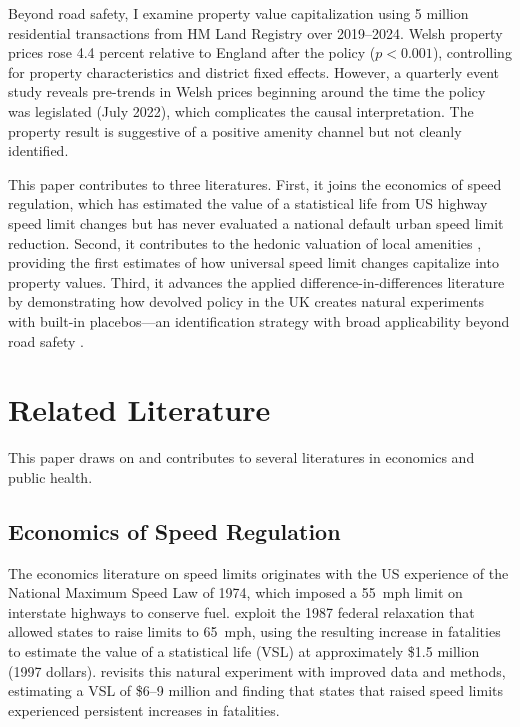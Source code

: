 \documentclass[12pt]{article}
\begin{document}
Beyond road safety, I examine property value capitalization using 5 million residential transactions from HM Land Registry over 2019--2024. Welsh property prices rose 4.4 percent relative to England after the policy ($p < 0.001$), controlling for property characteristics and district fixed effects. However, a quarterly event study reveals pre-trends in Welsh prices beginning around the time the policy was legislated (July 2022), which complicates the causal interpretation. The property result is suggestive of a positive amenity channel but not cleanly identified.

This paper contributes to three literatures. First, it joins the economics of speed regulation, which has estimated the value of a statistical life from US highway speed limit changes \citep{ashenfelter2004, vanbenthem2015} but has never evaluated a national default urban speed limit reduction. Second, it contributes to the hedonic valuation of local amenities \citep{rosen1974, chay2005, black1999}, providing the first estimates of how universal speed limit changes capitalize into property values. Third, it advances the applied difference-in-differences literature by demonstrating how devolved policy in the UK creates natural experiments with built-in placebos---an identification strategy with broad applicability beyond road safety \citep{callawaySantanna2021, goodmanbacon2021}.


\section{Related Literature}
\label{sec:literature}

This paper draws on and contributes to several literatures in economics and public health.

\subsection{Economics of Speed Regulation}

The economics literature on speed limits originates with the US experience of the National Maximum Speed Law of 1974, which imposed a 55~mph limit on interstate highways to conserve fuel. \citet{ashenfelter2004} exploit the 1987 federal relaxation that allowed states to raise limits to 65~mph, using the resulting increase in fatalities to estimate the value of a statistical life (VSL) at approximately \$1.5 million (1997 dollars). \citet{vanbenthem2015} revisits this natural experiment with improved data and methods, estimating a VSL of \$6--9 million and finding that states that raised speed limits experienced persistent increases in fatalities.
\end{document}
